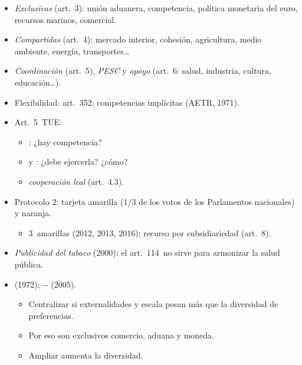 \documentclass{article}
\begin{document}
\begin{columnas}
\begin{itemize}
\item \emph{Exclusivas} (art.~3): unión aduanera, competencia, política monetaria del euro, recursos marinos, comercial.
\item \emph{Compartidas} (art.~4): mercado interior, cohesión, agricultura, medio ambiente, energía, transportes\ldots
\item \emph{Coordinación} (art.~5), \emph{PESC} y \emph{apoyo} (art.~6: salud, industria, cultura, educación\ldots).
\item Flexibilidad: art.~352; competencias implícitas (AETR, 1971).
\end{itemize}
\begin{itemize}
\item Art.~5~TUE:
  \begin{itemize}
  \item {}: ¿hay competencia?
  \item {} y : ¿debe ejercerla? ¿cómo?
  \item \emph{cooperación leal} (art.~4.3).
  \end{itemize}
\item Protocolo 2: tarjeta amarilla (1/3 de los votos de los Parlamentos nacionales) y naranja.
  \begin{itemize}
  \item 3~amarillas (2012, 2013, 2016); recurso por subsidiariedad (art.~8).
  \end{itemize}
\item \emph{Publicidad del tabaco} (2000): el art.~114~no sirve para armonizar la salud pública.
\end{itemize}
\begin{itemize}
\item {} (1972); -- (2005).
  \begin{itemize}
  \item Centralizar si externalidades y escala pesan más que la diversidad de preferencias.
  \item Por eso son exclusivos comercio, aduana y moneda.
  \item Ampliar aumenta la diversidad.
  \end{itemize}
\end{itemize}


\end{columnas}
\end{document}
